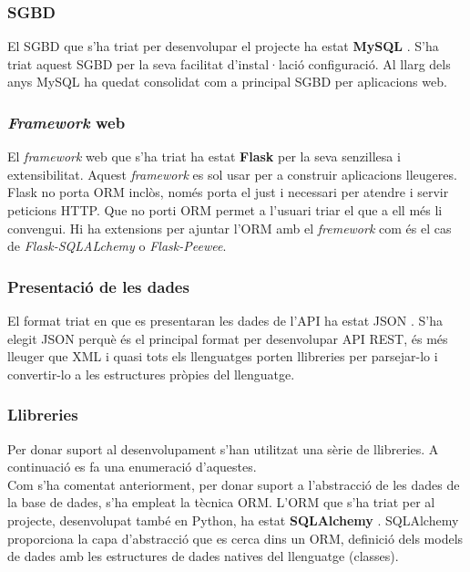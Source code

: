 	\subsubsection{\ac{SGBD}}
	El \ac{SGBD} que s'ha triat per desenvolupar el projecte ha estat \textbf{MySQL} \cite{mysql}. S'ha triat aquest \ac{SGBD} per la seva facilitat d'instal·lació configuració. Al llarg dels anys MySQL ha quedat consolidat com a principal \ac{SGBD} per aplicacions web.

	\subsubsection{\emph{Framework} web}
	El \emph{framework} web que s'ha triat ha estat \textbf{Flask} \cite{flask} per la seva senzillesa i extensibilitat. Aquest \emph{framework} es sol usar per a construir aplicacions lleugeres. \\
	
	Flask no porta \ac{ORM} inclòs, només porta el just i necessari per atendre i servir peticions \ac{HTTP}. Que no porti \ac{ORM} permet a l'usuari triar el que a ell més li convengui. Hi ha extensions per ajuntar l'\ac{ORM} amb el \emph{fremework} com és el cas de \emph{Flask-SQLALchemy} o \emph{Flask-Peewee}. 

	\subsubsection{Presentació de les dades}
	El format triat en que es presentaran les dades de l'\ac{API} ha estat \ac{JSON} \cite{json}. S'ha elegit \ac{JSON} perquè és el principal format per desenvolupar \ac{API} \ac{REST}, és més lleuger que \ac{XML} i quasi tots els llenguatges porten llibreries per parsejar-lo i convertir-lo a les estructures pròpies del llenguatge.

	\subsubsection{Llibreries}
	Per donar suport al desenvolupament s'han utilitzat una sèrie de llibreries. A continuació es fa una enumeració d'aquestes.\\

	Com s'ha comentat anteriorment, per donar suport a l'abstracció de les dades de la base de dades, s'ha empleat la tècnica \ac{ORM}. L'\ac{ORM} que s'ha triat per al projecte, desenvolupat també en Python, ha estat \textbf{SQLAlchemy} \cite{sqlalchemy}. SQLAlchemy proporciona la capa d'abstracció que es cerca dins un \ac{ORM}, definició dels models de dades amb les estructures de dades natives del llenguatge (classes).\\

